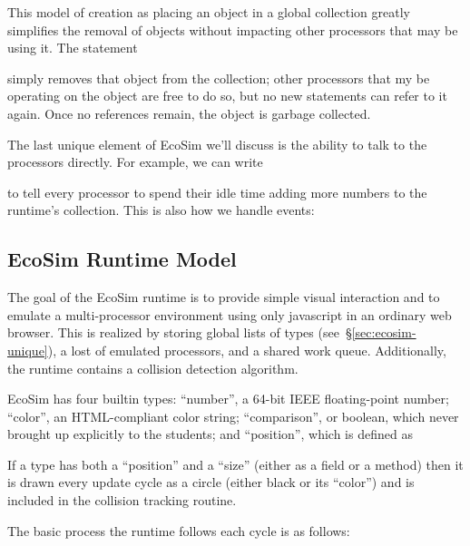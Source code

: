\documentclass{sig-alternate}
\newcommand{\INDSTATE}[1][1]{\STATE\hspace{#1\algorithmicindent}}
\newenvironment{snippet}{\begin{algorithmic}[1]}{\end{algorithmic}}
\begin{document}
This model of creation as placing an object in a global collection
greatly simplifies the removal of objects without impacting other processors that may be using it.
The statement
\begin{snippet}
\end{snippet}
simply removes that object from the collection;
other processors that my be operating on the object are free to do so,
but no new statements can refer to it again.
Once no references remain, the object is garbage collected.

The last unique element of EcoSim we'll discuss is the ability to talk to the processors directly.
For example, we can write
\begin{snippet}
\INDSTATE{create a number}
\end{snippet}
to tell every processor to spend their idle time adding more numbers to the runtime's collection.
This is also how we handle events:
\begin{snippet}
\INDSTATE{destroy the shrub}
\end{snippet}

\subsection{EcoSim Runtime Model}
The goal of the EcoSim runtime is to provide simple visual interaction
and to emulate a multi-processor environment
using only javascript in an ordinary web browser.
This is realized by storing global lists of types (see~\S\ref{sec:ecosim-unique}),
a lost of emulated processors, and a shared work queue.
Additionally, the runtime contains a collision detection algorithm.

EcoSim has four builtin types:
``number'', a 64-bit IEEE floating-point number;
``color'', an HTML-compliant color string;
``comparison'', or boolean, which never brought up explicitly to the students;
and ``position'', which is defined as
\begin{snippet}
\INDSTATE{x, a number}
\INDSTATE{y, a number}
\end{snippet}
If a type has both a ``position'' and a ``size'' (either as a field or a method)
then it is drawn every update cycle as a circle (either black or its ``color'')
and is included in the collision tracking routine.

The basic process the runtime follows each cycle is as follows:
\begin{algorithmic}[1]
\end{algorithmic}
\end{document}
